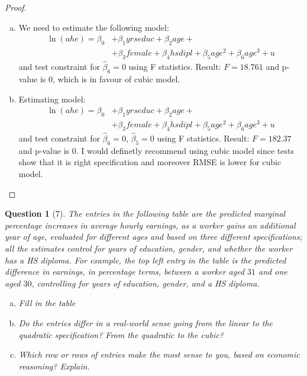 \documentclass[12pt,reqno]{amsart}
\theoremstyle{plain}
\newtheorem*{theorem*}{Question}
\begin{document}
\begin{proof}
\begin{enumerate}[(a)]
        \item We need to estimate the following model:
              \begin{align*}
                  \ln(ahe) = \beta_0 & + \beta_1 yrseduc + \beta_2 age +                                            \\
                                     & + \beta_3 female + \beta_4 hsdipl + \beta_5 age^{2} + \beta_{6} age^{3}  + u
              \end{align*}
              and test constraint for $ \hat{\beta}_{6} = 0 $ using F statistics. Result: $ F = 18.761 $ and
              p-value is 0, which is in favour of cubic model.
        \item Estimating model:
              \begin{align*}
                  \ln(ahe) = \beta_0 & + \beta_1 yrseduc + \beta_2 age +                                            \\
                                     & + \beta_3 female + \beta_4 hsdipl + \beta_5 age^{2} + \beta_{6} age^{3}  + u
              \end{align*}
              and test constraint for $ \hat{\beta}_{6} = 0 $, $ \hat{\beta}_{5} = 0 $ using F statistics. Result: $ F = 182.37 $ and
              p-value is 0. I would definetly recommend using cubic model since tests show that it is right
              specification and moreover RMSE is lower for cubic model.
    \end{enumerate}
\end{proof}
\begin{theorem*}[7]
    \normalfont
    The entries in the following table are the predicted marginal percentage increases in average
    hourly earnings, as a worker gains an additional year of age, evaluated for different ages and
    based on three different specifications; all the estimates control for years of education,
    gender, and whether the worker has a HS diploma. For example, the top left entry in the table
    is the predicted difference in earnings, in percentage terms, between a worker aged $ 31 $
    and one aged $ 30 $, controlling for years of education, gender, and a HS diploma.

    \begin{enumerate}[(a)]
        \item Fill in the table
        \item Do the entries differ in a real-world sense going from the linear to the quadratic
              specification? From the quadratic to the cubic?
        \item Which row or rows of entries make the most sense to you, based on economic reasoning?
              Explain.
    \end{enumerate}

\end{theorem*}
\end{document}
